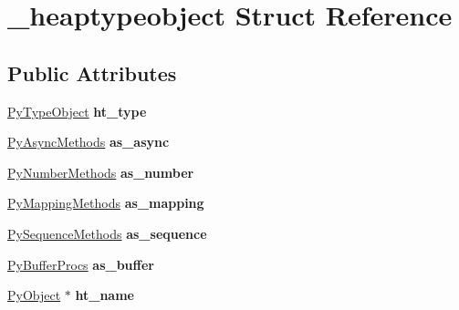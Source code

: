 \hypertarget{struct__heaptypeobject}{}\section{\+\_\+heaptypeobject Struct Reference}
\label{struct__heaptypeobject}
\subsection*{Public Attributes}
\begin{DoxyCompactItemize}
\item 
\hyperlink{struct__typeobject}{Py\+Type\+Object} {\bfseries ht\+\_\+type}\hypertarget{struct__heaptypeobject_a757f1d6b7f668a05fc6fc641b7a41338}{}\label{struct__heaptypeobject_a757f1d6b7f668a05fc6fc641b7a41338}

\item 
\hyperlink{structPyAsyncMethods}{Py\+Async\+Methods} {\bfseries as\+\_\+async}\hypertarget{struct__heaptypeobject_a88d59ac684ca7fdaaee47a3ab9ec5dbd}{}\label{struct__heaptypeobject_a88d59ac684ca7fdaaee47a3ab9ec5dbd}

\item 
\hyperlink{structPyNumberMethods}{Py\+Number\+Methods} {\bfseries as\+\_\+number}\hypertarget{struct__heaptypeobject_aaf1b8eff89b976c353ce3c4d949248e2}{}\label{struct__heaptypeobject_aaf1b8eff89b976c353ce3c4d949248e2}

\item 
\hyperlink{structPyMappingMethods}{Py\+Mapping\+Methods} {\bfseries as\+\_\+mapping}\hypertarget{struct__heaptypeobject_aaac5bd975acb4f8964ff2c999adb7310}{}\label{struct__heaptypeobject_aaac5bd975acb4f8964ff2c999adb7310}

\item 
\hyperlink{structPySequenceMethods}{Py\+Sequence\+Methods} {\bfseries as\+\_\+sequence}\hypertarget{struct__heaptypeobject_a5ee56648a9f528df46c03946f99fc4bc}{}\label{struct__heaptypeobject_a5ee56648a9f528df46c03946f99fc4bc}

\item 
\hyperlink{structPyBufferProcs}{Py\+Buffer\+Procs} {\bfseries as\+\_\+buffer}\hypertarget{struct__heaptypeobject_ab1b5548a0e48532173fbd4c3af7fa1a9}{}\label{struct__heaptypeobject_ab1b5548a0e48532173fbd4c3af7fa1a9}

\item 
\hyperlink{struct__object}{Py\+Object} $\ast$ {\bfseries ht\+\_\+name}\hypertarget{struct__heaptypeobject_a7eef1575c79c30ca3808cc1564b0bacc}{}\label{struct__heaptypeobject_a7eef1575c79c30ca3808cc1564b0bacc}


\end{DoxyCompactItemize}
